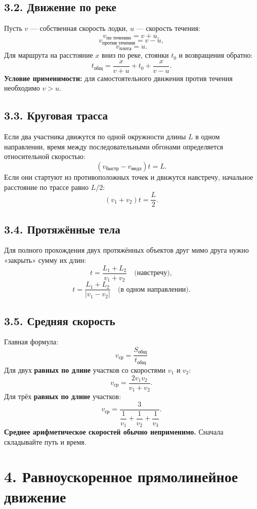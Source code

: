 \documentclass[a4paper,12pt]{article}
\newcommand{\key}[1]{\textbf{\color{darkaccent}#1}}
\newcommand{\warntext}[1]{\textbf{\color{warn}#1}}
\newcommand{\formula}[1]{\[\displaystyle #1\]}
\begin{document}
\subsection*{3.2. Движение по реке}
Пусть $v$ --- собственная скорость лодки, $u$ --- скорость течения:
\formula{v_{\text{по течению}}=v+u,}
\formula{v_{\text{против течения}}=v-u,}
\formula{v_{\text{плота}}=u.}
Для маршрута на расстояние $x$ вниз по реке, стоянки $t_0$ и возвращения обратно:
\formula{t_{\text{общ}}=\frac{x}{v+u}+t_0+\frac{x}{v-u}.}
\key{Условие применимости:} для самостоятельного движения против течения необходимо $v>u$.

\subsection*{3.3. Круговая трасса}
Если два участника движутся по одной окружности длины $L$ в одном направлении, время между последовательными обгонами определяется относительной скоростью:
\formula{(v_{\text{быстр}}-v_{\text{медл}})t=L.}
Если они стартуют из противоположных точек и движутся навстречу, начальное расстояние по трассе равно $L/2$:
\formula{(v_1+v_2)t=\frac{L}{2}.}

\subsection*{3.4. Протяжённые тела}
Для полного прохождения двух протяжённых объектов друг мимо друга нужно «закрыть» сумму их длин:
\formula{t=\frac{L_1+L_2}{v_1+v_2} \quad \text{(навстречу)},}
\formula{t=\frac{L_1+L_2}{|v_1-v_2|} \quad \text{(в одном направлении)}.}

\subsection*{3.5. Средняя скорость}
Главная формула:
\formula{\boxed{v_{\text{ср}}=\frac{S_{\text{общ}}}{t_{\text{общ}}}}}
Для двух \textbf{равных по длине} участков со скоростями $v_1$ и $v_2$:
\formula{v_{\text{ср}}=\frac{2v_1v_2}{v_1+v_2}.}
Для трёх \textbf{равных по длине} участков:
\formula{v_{\text{ср}}=\frac{3}{\dfrac1{v_1}+\dfrac1{v_2}+\dfrac1{v_3}}.}
\warntext{Среднее арифметическое скоростей обычно неприменимо.} Сначала складывайте путь и время.

\normalsize
\clearpage

\section*{4. Равноускоренное прямолинейное движение}
\small
\end{document}
